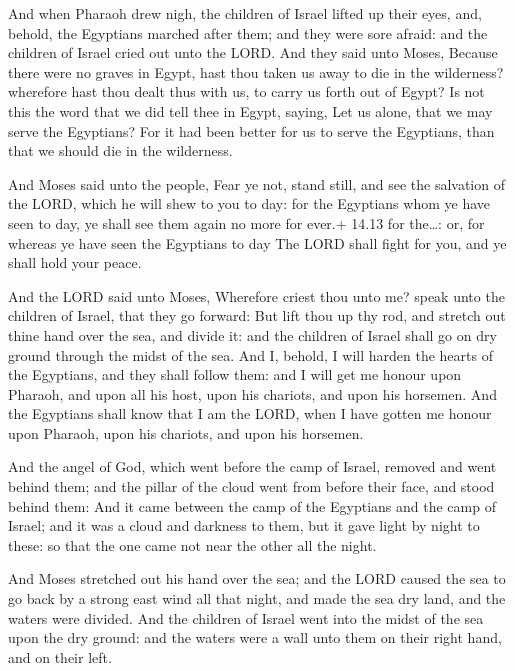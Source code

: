  And when Pharaoh drew nigh, the children of Israel
lifted up their eyes, and, behold, the Egyptians marched after them; and
they were sore afraid: and the children of Israel cried out unto the
LORD.  And they said unto Moses, Because there were no
graves in Egypt, hast thou taken us away to die in the wilderness?
wherefore hast thou dealt thus with us, to carry us forth out of Egypt?
 Is not this the word that we did tell thee in Egypt,
saying, Let us alone, that we may serve the Egyptians? For it had been
better for us to serve the Egyptians, than that we should die in the
wilderness.

 And Moses said unto the people, Fear ye not, stand
still, and see the salvation of the LORD, which he will shew to you to
day: for the Egyptians whom ye have seen to day, ye shall see them again
no more for ever.+ 14.13 for the\ldots: or, for whereas ye have seen the
Egyptians to day  The LORD shall fight for you, and ye
shall hold your peace.

 And the LORD said unto Moses, Wherefore criest thou unto
me? speak unto the children of Israel, that they go forward:
 But lift thou up thy rod, and stretch out thine hand over
the sea, and divide it: and the children of Israel shall go on dry
ground through the midst of the sea.  And I, behold, I will
harden the hearts of the Egyptians, and they shall follow them: and I
will get me honour upon Pharaoh, and upon all his host, upon his
chariots, and upon his horsemen.  And the Egyptians shall
know that I am the LORD, when I have gotten me honour upon Pharaoh, upon
his chariots, and upon his horsemen.

 And the angel of God, which went before the camp of
Israel, removed and went behind them; and the pillar of the cloud went
from before their face, and stood behind them:  And it came
between the camp of the Egyptians and the camp of Israel; and it was a
cloud and darkness to them, but it gave light by night to these: so that
the one came not near the other all the night.

 And Moses stretched out his hand over the sea; and the
LORD caused the sea to go back by a strong east wind all that night, and
made the sea dry land, and the waters were divided.  And
the children of Israel went into the midst of the sea upon the dry
ground: and the waters were a wall unto them on their right hand, and on
their left.


